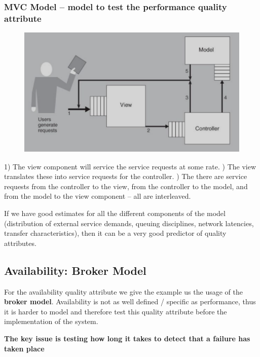 \documentclass[a4paper]{article}
\begin{document}
\subsubsection{MVC Model – model to test the performance quality attribute}
\begin{figure}[H]
  \includegraphics[scale=0.5]{images/mcv-performance.png}
\end{figure}

1) The view component will service the service requests at some rate.  ) The view translates these into service requests for the controller.  ) The there are service requests from the controller to the view, from the controller to the model, and from the model to the view component – all are interleaved.  \newline

If we have good estimates for all the different components of the model (distribution of external service demands, queuing disciplines, network latencies, transfer characteristics), then it can be a very good predictor of quality attributes.

\subsection{Availability: Broker Model}
For the availability quality attribute we give the example us the usage of the \textbf{broker model}. Availability is not as well defined / specific as performance, thus it is harder to model and therefore test this quality attribute before the implementation of the system.

\textbf{The key issue is testing how long it takes to detect that a failure has taken place}
\end{document}
